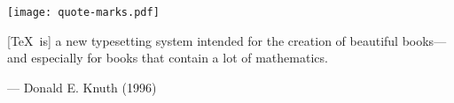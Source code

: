 \newcommand{\myquoter}{}
\newenvironment{myquote}[1]{
	\renewcommand{\myquoter}{#1}
	\begin{center}
	\begin{minipage}[c]{0.3\textwidth} 
		\texttt{[image: quote-marks.pdf]}
	\end{minipage}
	\begin{minipage}[c]{0.69\textwidth}
}{
	\begin{flushright}--- \myquoter\end{flushright}
	\end{minipage}
\end{center}
}

\blindtext[1]

\begin{myquote}{Donald E. Knuth (1996)}
		[\TeX\ is] a new typesetting system intended for the creation
of beautiful books---and especially for books that contain a lot of
mathematics.
\end{myquote}

\blindtext[1]
